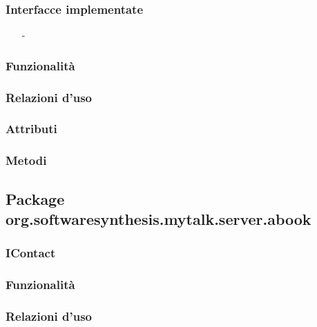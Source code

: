 \subsubsection*{Interfacce implementate}
\begin{itemize}[noitemsep,nolistsep]
  \item[-]
\end{itemize}

\subsubsection*{Funzionalità}

\subsubsection*{Relazioni d'uso}

\subsubsection*{Attributi}

\subsubsection*{Metodi}

\subsection{Package org.softwaresynthesis.mytalk.server.abook}\label{sec:abook}

\subsubsection{IContact}\label{sec:icontact}

\subsubsection*{Funzionalità}

\subsubsection*{Relazioni d'uso}

